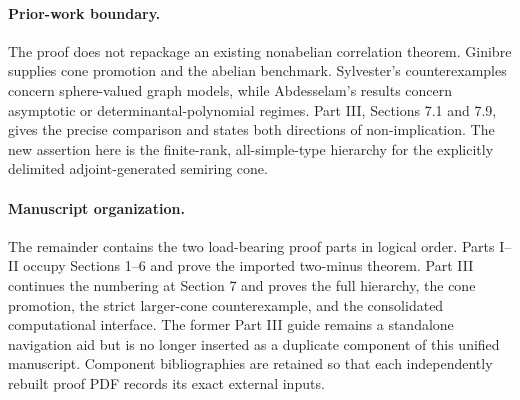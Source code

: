 \documentclass[11pt]{article}
\begin{document}
\paragraph{Prior-work boundary.}
The proof does not repackage an existing nonabelian correlation theorem.
Ginibre supplies cone promotion and the abelian benchmark.  Sylvester's
counterexamples concern sphere-valued graph models, while Abdesselam's
results concern asymptotic or determinantal-polynomial regimes.  Part III,
Sections 7.1 and 7.9, gives the precise comparison and states both directions
of non-implication.  The new assertion here is the finite-rank,
all-simple-type hierarchy for the explicitly delimited adjoint-generated
semiring cone.

\paragraph{Manuscript organization.}
The remainder contains the two load-bearing proof parts in logical order.
Parts I--II occupy Sections 1--6 and prove the imported two-minus theorem.
Part III continues the numbering at Section 7 and proves the full hierarchy,
the cone promotion, the strict larger-cone counterexample, and the consolidated
computational interface.  The former Part III guide remains a
standalone navigation aid but is no longer inserted as a duplicate component
of this unified manuscript.  Component bibliographies are retained so that
each independently rebuilt proof PDF records its exact external inputs.

\clearpage





\end{document}
